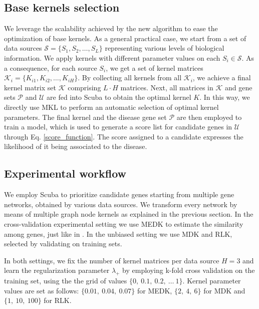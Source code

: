 \subsection*{Base kernels selection}\label{basekernels}
We leverage the scalability achieved by the new algorithm to ease the optimization of base kernels. As a general practical case, we start from a set of data sources $\mathcal{S} = \lbrace S_1, S_2,\ldots, S_L \rbrace$ representing various levels of biological information. We apply kernels with different parameter values on each $S_i \in \mathcal{S}$. As a consequence, for each source $S_i$, we get a set of kernel matrices $\mathcal{K}_i = \lbrace K_{i1}, K_{i2},\ldots, K_{iH} \rbrace$. By collecting all kernels from all $\mathcal{K}_i$, we achieve a final kernel matrix set $\mathcal{K}$ comprising $L\cdot H$ matrices. Next, all matrices in $\mathcal{K}$ and gene sets $\mathcal{P}$ and $\mathcal{U}$ are fed into Scuba to obtain the optimal kernel $K$. In this way, we directly use MKL to perform an automatic selection of optimal kernel parameters. The final kernel and the disease gene set $\mathcal{P}$ are then employed to train a model, which is used to generate a score list for candidate genes in $\mathcal{U}$ through Eq. \ref{score_function}. The score assigned to a candidate expresses the likelihood of it being associated to the disease.  

\subsection*{Experimental workflow}
We employ Scuba to prioritize candidate genes starting from multiple gene networks, obtained by various data sources. We transform every network by means of multiple graph node kernels as explained in the previous section. In the cross-validation experimental setting we use MEDK to estimate the similarity among genes, just like in \cite{f3pc}. In the unbiased setting we use MDK and RLK, selected by validating on training sets.

In both settings, we fix the number of kernel matrices per data source $H=3$ and learn the regularization parameter $\lambda_{+}$ by employing k-fold cross validation on the training set, using the the grid of values $\lbrace 0, \ 0.1,\ 0.2,\ \ldots \ 1 \rbrace$. Kernel parameter values are set as follows: $\lbrace 0.01,\ 0.04,\ 0.07 \rbrace$ for MEDK, $\lbrace 2,\ 4,\ 6 \rbrace$ for MDK and $\lbrace 1,\ 10,\ 100 \rbrace$ for RLK.

